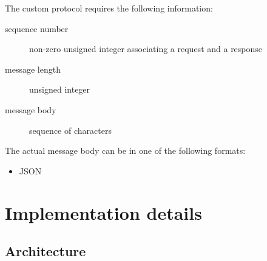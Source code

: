 \documentclass[a4paper,10pt]{article}
\begin{document}
The custom protocol requires the following information:
\begin{description}
  \item[sequence number] non-zero unsigned integer associating 
                        a request and a response
  \item[message length] unsigned integer
  \item[message body] sequence of characters
\end{description}

The actual message body can be in one of the following formats:
\begin{itemize}
 \item JSON
\end{itemize}


\section{Implementation details}

\subsection{Architecture}
\end{document}
